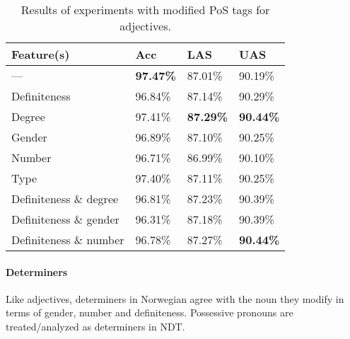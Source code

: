\documentclass[11pt,a4paper]{article}
\begin{document}
\begin{table}
    \centering
    \smaller[0.5]
    \begin{tabular}{@{}llll@{}}
        \toprule
        \textbf{Feature(s)} & \textbf{Acc} & \textbf{LAS} & \textbf{UAS}
        \\
        \midrule
        --- & \textbf{97.47\%} & 87.01\% & 90.19\% \\
        Definiteness & 96.84\% & 87.14\% & 90.29\% \\
        Degree & 97.41\% & \textbf{87.29\%} & \textbf{90.44\%} \\
        Gender & 96.89\% & 87.10\% & 90.25\% \\
        Number & 96.71\% & 86.99\% & 90.10\% \\
        Type & 97.40\% & 87.11\% & 90.25\% \\
        Definiteness \& degree & 96.81\% & 87.23\% & 90.39\% \\
        Definiteness \& gender & 96.31\% & 87.18\% & 90.39\% \\
        Definiteness \& number & 96.78\% & 87.27\% & \textbf{90.44\%} \\
        \bottomrule
    \end{tabular}
    \caption{Results of experiments with modified PoS tags for adjectives.}
    \label{adjresults}
\end{table}

\paragraph{Determiners}
Like adjectives, determiners in Norwegian agree with the noun they modify in
terms of gender, number and definiteness. Possessive pronouns are
treated/analyzed as determiners in NDT.

\end{document}

